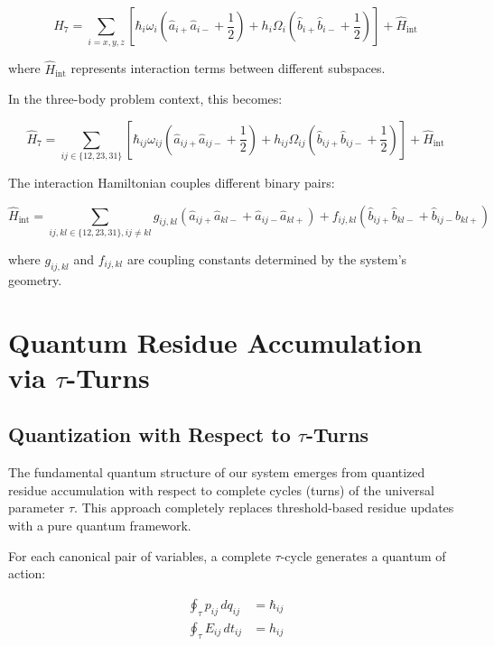\documentclass{article}
\begin{document}
\begin{equation}
\hat{H}_7 = \sum_{i=x,y,z} \left[ \hbar_i \omega_i (\hat{a}_{i+}\hat{a}_{i-} + \frac{1}{2}) + h_i \Omega_i (\hat{b}_{i+}\hat{b}_{i-} + \frac{1}{2}) \right] + \hat{H}_{\text{int}}
\end{equation}

where $\hat{H}_{\text{int}}$ represents interaction terms between different subspaces.

In the three-body problem context, this becomes:

\begin{equation}
\hat{H}_7 = \sum_{ij \in \{12,23,31\}} \left[ \hbar_{ij} \omega_{ij} (\hat{a}_{ij+}\hat{a}_{ij-} + \frac{1}{2}) + h_{ij} \Omega_{ij} (\hat{b}_{ij+}\hat{b}_{ij-} + \frac{1}{2}) \right] + \hat{H}_{\text{int}}
\end{equation}

The interaction Hamiltonian couples different binary pairs:

\begin{equation}
\hat{H}_{\text{int}} = \sum_{ij,kl \in \{12,23,31\}, ij \neq kl} g_{ij,kl} (\hat{a}_{ij+}\hat{a}_{kl-} + \hat{a}_{ij-}\hat{a}_{kl+}) + f_{ij,kl} (\hat{b}_{ij+}\hat{b}_{kl-} + \hat{b}_{ij-}\hat{b}_{kl+})
\end{equation}

where $g_{ij,kl}$ and $f_{ij,kl}$ are coupling constants determined by the system's geometry.

\section{Quantum Residue Accumulation via $\tau$-Turns}

\subsection{Quantization with Respect to $\tau$-Turns}

The fundamental quantum structure of our system emerges from quantized residue accumulation with respect to complete cycles (turns) of the universal parameter $\tau$. This approach completely replaces threshold-based residue updates with a pure quantum framework.

For each canonical pair of variables, a complete $\tau$-cycle generates a quantum of action:

\begin{align}
\oint_\tau p_{ij} \, dq_{ij} &= \hbar_{ij} \\
\oint_\tau E_{ij} \, dt_{ij} &= h_{ij}
\end{align}
\end{document}
